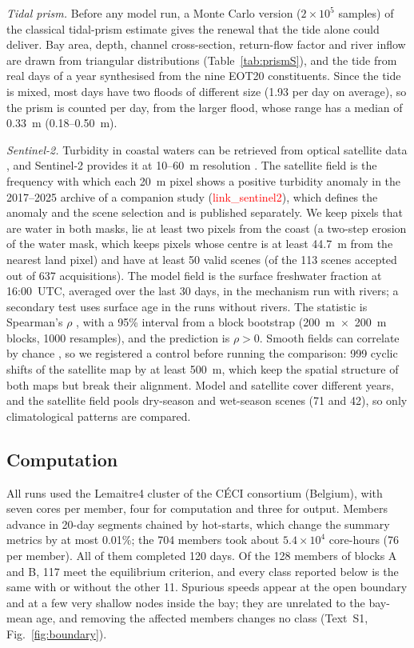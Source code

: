 \documentclass[a4paper,fleqn]{ems-dc}
\newcommand{\ph}[1]{\textcolor{red}{\textsf{#1}}}
\begin{document}
\emph{Tidal prism.} Before any model run, a Monte Carlo version ($2\times10^5$ samples) of
the classical tidal-prism estimate \citep{Fischer1979,Sanford1992} gives the renewal that
the tide alone could deliver. Bay area, depth, channel cross-section, return-flow factor and
river inflow are drawn from triangular distributions (Table~\ref{tab:prismS}), and the tide
from real days of a year synthesised from the nine EOT20 constituents. Since the tide is
mixed, most days have two floods of different size (1.93 per day on average), so the prism
is counted per day, from the larger flood, whose range has a median of 0.33~m
(0.18--0.50~m).

\emph{Sentinel-2.} Turbidity in coastal waters can be retrieved from optical satellite data
\citep{Dogliotti2015}, and Sentinel-2 provides it at 10--60~m resolution \citep{Drusch2012}.
The satellite field is the frequency with which each 20~m pixel shows a positive turbidity
anomaly in the 2017--2025 archive of a companion study (\ph{link\_sentinel2}), which defines
the anomaly and the scene selection and is published separately. We keep pixels that are
water in both masks, lie at least two pixels from the coast (a two-step erosion of the
water mask, which keeps pixels whose centre is at least 44.7~m from the nearest land pixel)
and have at least 50 valid scenes (of the 113 scenes accepted out of 637 acquisitions). The
model field is the surface freshwater fraction at 16:00~UTC, averaged over the last 30 days,
in the mechanism run with rivers; a secondary test uses surface age in the runs without
rivers. The statistic is Spearman's $\rho$ \citep{Spearman1904}, with a 95\% interval from a
block bootstrap \citep{Kunsch1989} (200~m~$\times$~200~m blocks, 1000 resamples), and the
prediction is $\rho > 0$. Smooth fields can correlate by chance
\citep{Clifford1989,Lennon2000}, so we registered a control before running the comparison:
999 cyclic shifts of the satellite map by at least 500~m, which keep the spatial structure
of both maps but break their alignment. Model and satellite cover different years, and the
satellite field pools dry-season and wet-season scenes (71 and 42), so only climatological
patterns are compared.

\subsection{Computation}\label{sec:res-model}
All runs used the Lemaitre4 cluster of the C\'ECI consortium (Belgium), with seven cores per
member, four for computation and three for output. Members advance in 20-day segments
chained by hot-starts, which change the summary metrics by at most 0.01\%; the 704 members
took about $5.4\times10^4$ core-hours (76 per member). All of them completed 120 days. Of
the 128 members of blocks A and B, 117 meet the equilibrium criterion, and every class
reported below is the same with or without the other 11. Spurious speeds appear at the
open boundary and at a few very shallow nodes inside the bay; they are unrelated to the
bay-mean age, and removing the affected members changes no class (Text~S1,
Fig.~\ref{fig:boundary}).
\end{document}
